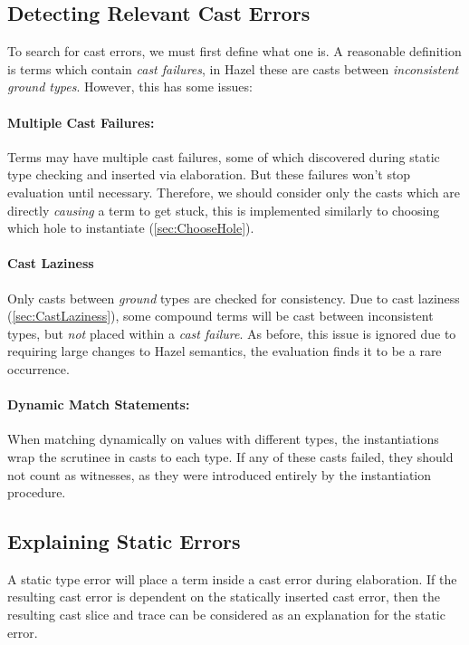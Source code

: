 \subsection{Detecting Relevant Cast Errors}
\label{sec:CastFailureDetection}
To search for cast errors, we must first define what one is. A reasonable definition is terms which contain \textit{cast failures}, in Hazel these are casts between \textit{inconsistent ground types}. However, this has some issues:

\paragraph{Multiple Cast Failures:} Terms may have multiple cast failures, some of which discovered during static type checking and inserted via elaboration. But these failures won't stop evaluation until necessary. Therefore, we should consider only the casts which are directly \textit{causing} a term to get stuck, this is implemented similarly to choosing which hole to instantiate (\cref{sec:ChooseHole}).

\paragraph{Cast Laziness}
\label{sec:SearchCastLaziness}
Only casts between \textit{ground} types are checked for consistency. Due to cast laziness (\cref{sec:CastLaziness}), some compound terms will be cast between inconsistent types, but \textit{not} placed within a \textit{cast failure}. As before, this issue is ignored due to requiring large changes to Hazel semantics, the evaluation finds it to be a rare occurrence.

\paragraph{Dynamic Match Statements:} When matching dynamically on values with different types, the instantiations wrap the scrutinee in casts to each type. If any of these casts failed, they should not count as witnesses, as they were introduced entirely by the instantiation procedure. 

\subsection{Explaining Static Errors}
\label{sec:StaticCastError}
A static type error will place a term inside a cast error during elaboration. If the resulting cast error is dependent on the statically inserted cast error, then the resulting cast slice and trace can be considered as an explanation for the static error.

